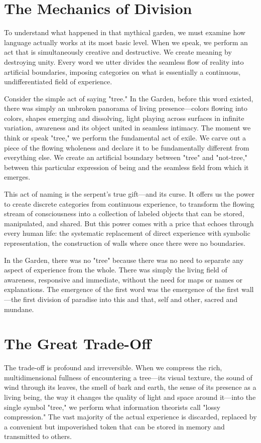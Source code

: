 \section{The Mechanics of Division}

To understand what happened in that mythical garden, we must examine how language actually works at its most basic level. When we speak, we perform an act that is simultaneously creative and destructive. We create meaning by destroying unity. Every word we utter divides the seamless flow of reality into artificial boundaries, imposing categories on what is essentially a continuous, undifferentiated field of experience.

Consider the simple act of saying "tree." In the Garden, before this word existed, there was simply an unbroken panorama of living presence—colors flowing into colors, shapes emerging and dissolving, light playing across surfaces in infinite variation, awareness and its object united in seamless intimacy. The moment we think or speak "tree," we perform the fundamental act of exile. We carve out a piece of the flowing wholeness and declare it to be fundamentally different from everything else. We create an artificial boundary between "tree" and "not-tree," between this particular expression of being and the seamless field from which it emerges.

This act of naming is the serpent's true gift—and its curse. It offers us the power to create discrete categories from continuous experience, to transform the flowing stream of consciousness into a collection of labeled objects that can be stored, manipulated, and shared. But this power comes with a price that echoes through every human life: the systematic replacement of direct experience with symbolic representation, the construction of walls where once there were no boundaries.

In the Garden, there was no "tree" because there was no need to separate any aspect of experience from the whole. There was simply the living field of awareness, responsive and immediate, without the need for maps or names or explanations. The emergence of the first word was the emergence of the first wall—the first division of paradise into this and that, self and other, sacred and mundane.

\section{The Great Trade-Off}

The trade-off is profound and irreversible. When we compress the rich, multidimensional fullness of encountering a tree—its visual texture, the sound of wind through its leaves, the smell of bark and earth, the sense of its presence as a living being, the way it changes the quality of light and space around it—into the single symbol "tree," we perform what information theorists call "lossy compression." The vast majority of the actual experience is discarded, replaced by a convenient but impoverished token that can be stored in memory and transmitted to others.

